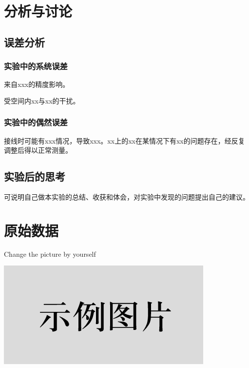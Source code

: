 \documentclass[UTF8]{ctexart}
\begin{document}
\section{分析与讨论}

\subsection{误差分析}

\subsubsection{实验中的系统误差}
来自xxx的精度影响。

受空间内xx与xx的干扰。

\subsubsection{实验中的偶然误差}
接线时可能有xxx情况，导致xxx。xx上的xx在某情况下有xx的问题存在，经反复调整后得以正常测量。

\subsection{实验后的思考}
可说明自己做本实验的总结、收获和体会，对实验中发现的问题提出自己的建议。

\newpage
\section{原始数据}
\begin{center}
    Change the picture by yourself
    
    
    \includegraphics{picture/example.png}
\end{center}




\end{document}
